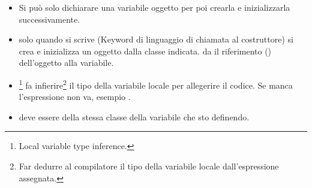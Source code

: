 \begin{itemize}
	\item {} Si può solo dichiarare una variabile oggetto per poi crearla e inizializzarla successivamente.
	\item solo quando si scrive  (Keyword di linguaggio di chiamata al costruttore) si crea e inizializza un oggetto dalla classe indicata.  da il riferimento () dell'oggetto alla variabile.
	\item {}\footnote{Local variable type inference.} fa infierire\footnote{Far dedurre al compilatore il tipo della variabile locale dall'espressione assegnata.} il tipo della variabile locale per allegerire il codice. Se manca l'espressione non va, esempio .
	\item {} deve essere della stessa classe della variabile che sto definendo.
\end{itemize}